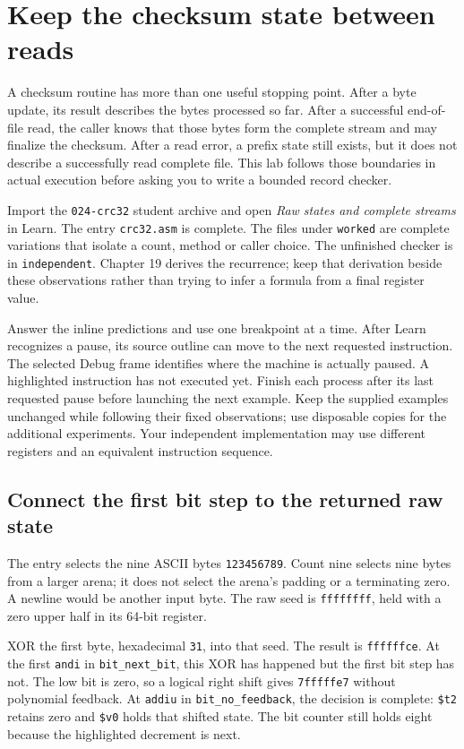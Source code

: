 \chapter{Keep the checksum state between reads}
\label{revision-lab:crc}

A checksum routine has more than one useful stopping point. After a byte update,
its result describes the bytes processed so far. After a successful end-of-file
read, the caller knows that those bytes form the complete stream and may finalize
the checksum. After a read error, a prefix state still exists, but it does not
describe a successfully read complete file. This lab follows those boundaries in
actual execution before asking you to write a bounded record checker.

Import the \texttt{024-crc32} student archive and open \emph{Raw states and complete
  streams} in Learn. The entry \texttt{crc32.asm} is complete. The files under
\texttt{worked} are complete variations that isolate a count, method or caller
choice. The unfinished checker is in \texttt{independent}. Chapter 19 derives
the recurrence; keep that derivation beside these observations rather than
trying to infer a formula from a final register value.

Answer the inline predictions and use one breakpoint at a time. After Learn
recognizes a pause, its source outline can move to the next requested instruction.
The selected Debug frame identifies where the machine is actually paused. A
highlighted instruction has not executed yet. Finish each process after its last
requested pause before launching the next example. Keep the supplied examples
unchanged while following their fixed observations; use disposable copies for the
additional experiments. Your independent implementation may use different
registers and an equivalent instruction sequence.

\section{Connect the first bit step to the returned raw state}

The entry selects the nine ASCII bytes \texttt{123456789}. Count nine selects
nine bytes from a larger arena; it does not select the arena's padding or a
terminating zero. A newline would be another input byte. The raw seed is
\texttt{ffffffff}, held with a zero upper half in its 64-bit register.

XOR the first byte, hexadecimal \texttt{31}, into that seed. The result is
\texttt{ffffffce}. At the first \texttt{andi} in \texttt{bit\_next\_bit}, this
XOR has happened but the first bit step has not. The low bit is zero, so a
logical right shift gives \texttt{7fffffe7} without polynomial feedback. At
\texttt{addiu} in \texttt{bit\_no\_feedback}, the decision is complete:
\texttt{\$t2} retains zero and \texttt{\$v0} holds that shifted state. The bit
counter still holds eight because the highlighted decrement is next.


